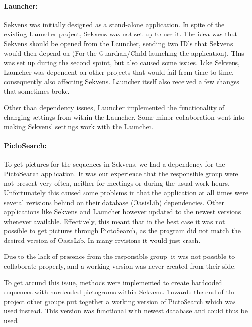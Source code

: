 \paragraph{Launcher:}
Sekvens was initially designed as a stand-alone application. In spite of the existing Launcher project, Sekvens was not set up to use it. The idea was that Sekvens should be opened from the Launcher, sending two ID's that Sekvens would then depend on (For the Guardian/Child launching the application). This was set up during the second sprint, but also caused some issues. Like Sekvens, Launcher was dependent on other projects that would fail from time to time, consequently also affecting Sekvens. Launcher itself also received a few changes that sometimes broke.

Other than dependency issues, Launcher implemented the functionality of changing settings from within the Launcher. Some minor collaboration went into making Sekvens' settings work with the Launcher.

\paragraph{PictoSearch:}
To get pictures for the sequences in Sekvens, we had a dependency for the PictoSearch application. It was our experience that the responsible group were not present very often, neither for meetings or during the usual work hours. Unfortunately this caused some problems in that the application at all times were several revisions behind on their database (OasisLib) dependencies. Other applications like Sekvens and Launcher however updated to the newest versions whenever available. Effectively, this meant that in the best case it was not possible to get pictures through PictoSearch, as the program did not match the desired version of OasisLib. In many revisions it would just crash.

Due to the lack of presence from the responsible group, it was not possible to collaborate properly, and a working version was never created from their side.

To get around this issue, methods were implemented to create hardcoded sequences with hardcoded pictograms within Sekvens. Towards the end of the project other groups put together a working version of PictoSearch which was used instead. This version was functional with newest database and could thus be used.

